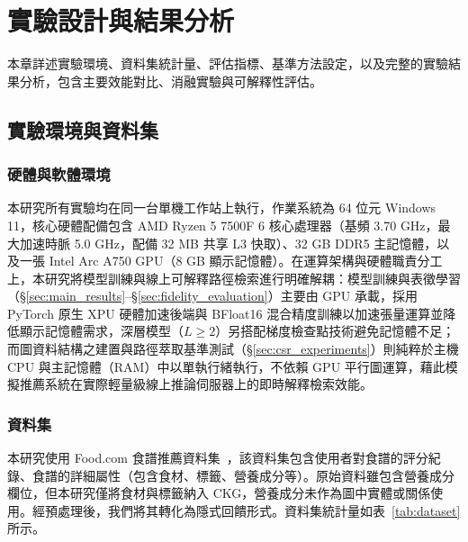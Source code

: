 
\chapter{實驗設計與結果分析}

本章詳述實驗環境、資料集統計量、評估指標、基準方法設定，以及完整的實驗結果分析，包含主要效能對比、消融實驗與可解釋性評估。

\section{實驗環境與資料集}

\subsection*{硬體與軟體環境}

本研究所有實驗均在同一台單機工作站上執行，作業系統為 64 位元 Windows 11，核心硬體配備包含 AMD Ryzen 5 7500F 6 核心處理器（基頻 3.70 GHz，最大加速時脈 5.0 GHz，配備 32 MB 共享 L3 快取）、32 GB DDR5 主記憶體，以及一張 Intel Arc A750 GPU（8 GB 顯示記憶體）。在運算架構與硬體職責分工上，本研究將模型訓練與線上可解釋路徑檢索進行明確解耦：模型訓練與表徵學習（§\ref{sec:main_results}--\S\ref{sec:fidelity_evaluation}）主要由 GPU 承載，採用 PyTorch 原生 XPU 硬體加速後端與 BFloat16 混合精度訓練以加速張量運算並降低顯示記憶體需求，深層模型（$L \geq 2$）另搭配梯度檢查點技術避免記憶體不足；而圖資料結構之建置與路徑萃取基準測試（§\ref{sec:csr_experiments}）則純粹於主機 CPU 與主記憶體（RAM）中以單執行緒執行，不依賴 GPU 平行圖運算，藉此模擬推薦系統在實際輕量級線上推論伺服器上的即時解釋檢索效能。

\subsection*{資料集}

本研究使用 Food.com 食譜推薦資料集~\cite{majumder2019foodcom}，該資料集包含使用者對食譜的評分紀錄、食譜的詳細屬性（包含食材、標籤、營養成分等）。原始資料雖包含營養成分欄位，但本研究僅將食材與標籤納入 CKG，營養成分未作為圖中實體或關係使用。經預處理後，我們將其轉化為隱式回饋形式。資料集統計量如表~\ref{tab:dataset} 所示。

